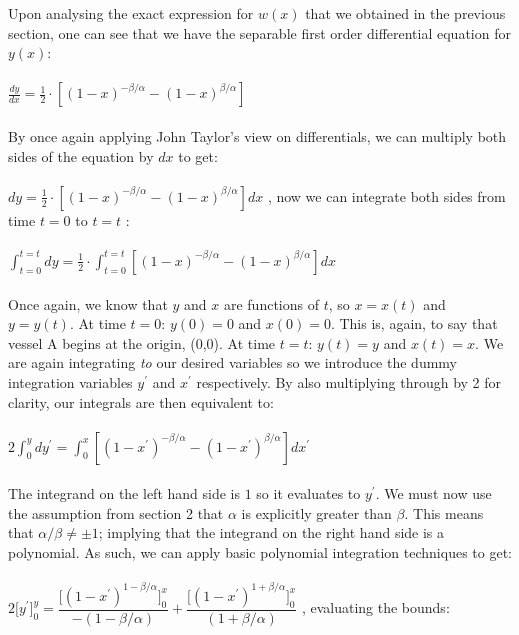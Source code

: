 \documentclass[12pt]{article}
\begin{document}
	\indent \indent Upon analysing the exact expression for $w(x)$ that we obtained in the previous section, one can see that we have the separable first order differential equation for $y(x)$: 
	\\
	\\
	$\frac{dy}{dx}=\frac{1}{2}\cdot[(1-x)^{-\beta/\alpha}-(1-x)^{\beta/\alpha}]$
	\\
	\\
	\indent By once again applying John Taylor's view on differentials, we can multiply both sides of the equation by $dx$ to get:
	\\
	\\
	$dy=\frac{1}{2}\cdot[(1-x)^{-\beta/\alpha}-(1-x)^{\beta/\alpha}]dx$ \hspace{0.3cm}, now we can integrate both sides from time $t=0$ to $t=t$ :
	\\
	\\
	{\Large $\int^{t=t}_{t=0}$}$dy=\frac{1}{2}\cdot${\Large $\int^{t=t}_{t=0}$}$[(1-x)^{-\beta/\alpha}-(1-x)^{\beta/\alpha}]dx$
	\\
	\\
	\indent Once again, we know that $y$ and $x$ are functions of $t$, so $x=x(t)$ and $y=y(t)$. At time $t=0$: $y(0)=0$ and $x(0)=0$. This is, again, to say that vessel A begins at the origin, (0,0). At time $t=t$: $y(t)=y$ and $x(t)=x$. We are again integrating \textit{to} our desired variables so we introduce the dummy integration variables $y^{\prime}$ and $x^{\prime}$ respectively. By also multiplying through by 2 for clarity, our integrals are then equivalent to:
	\\
	\\
	$2${\Large $\int^y_0$}$dy^{\prime}=${\Large $\int^x_0$}$[(1-x^{\prime})^{-\beta/\alpha}-(1-x^{\prime})^{\beta/\alpha}]dx^{\prime}$
	\\
	\\
	\indent The integrand on the left hand side is $1$ so it evaluates to $y^{\prime}$. We must now use the assumption from section 2 that $\alpha$ is explicitly greater than $\beta$. This means that $\alpha/\beta\neq\pm1$; implying that the integrand on the right hand side is a polynomial. As such, we can apply basic polynomial integration techniques to get:
	\\
	\\
	$2\bigg[y^{\prime}\bigg]^y_0=\dfrac{\Big[(1-x^{\prime})^{1-\beta/\alpha}\Big]^x_0}{-(1-\beta/\alpha)}+\dfrac{\Big[(1-x^{\prime})^{1+\beta/\alpha}\Big]^x_0}{(1+\beta/\alpha)}$ \hspace{1cm}, evaluating the bounds:
\end{document}
